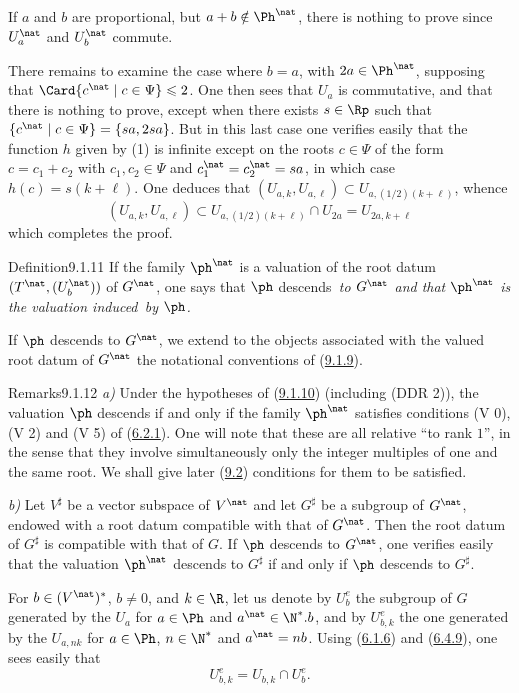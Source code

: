 \documentclass[12pt,a4paper,oneside,english]{smfart}
\makeatletter
\newcommand{\btanchor}[1]{\leavevmode\Hy@raisedlink{\hypertarget{bt:#1}{}}}
\newcommand{\btpageanchor}[1]{\Hy@raisedlink{\hypertarget{p:#1}{}}}
\newcommand{\btref}[1]{\hyperlink{bt:#1}{#1}}
\newcommand{\btpage}[1]{\marginnote{p.~#1}\btpageanchor{#1}}
\newcommand{\pg}[1]{\btpage{#1}}
\theoremstyle{definition}
\theoremstyle{bt}
\makeatother
\begin{document}
If $a$ and $b$ are proportional, but $a+b\notin\Ph^\nat$, there is nothing to prove
since $U^\nat_a$ and $U^\nat_b$ commute.

There remains to examine the case where $b=a$, with $2a\in\Ph^\nat$, supposing that
$\Card\{c^\nat\mid c\in\Psi\}\leqslant2$. One then sees that $U_a$ is commutative, and
that there is nothing to prove, except when there exists $s\in\Rp$ such that
$\{c^\nat\mid c\in\Psi\}=\{sa,2sa\}$. But in this last case one verifies easily that the
function $h$ given by (1) is infinite except on the roots $c\in\Psi$ of the form
$c=c_1+c_2$ with $c_1,c_2\in\Psi$ and $c_1^\nat=c_2^\nat=sa$, in which case
$h(c)=s(k+\ell)$. One deduces that
$(U_{a,k},U_{a,\ell})\subset U_{a,(1/2)(k+\ell)}$, whence
\[
(U_{a,k},U_{a,\ell})\subset U_{a,(1/2)(k+\ell)}\cap U_{2a}=U_{2a,k+\ell}
\]
which completes the proof.

\begin{stmt}{Definition}{9.1.11}\btanchor{9.1.11}
If the family $\ph^\nat$ is a valuation of the root datum
$(T^\nat,(U^\nat_b))$ of $G^\nat$, one says that $\ph$ \upshape descends\itshape\ to
$G^\nat$ and that $\ph^\nat$ is the valuation \upshape induced\itshape\ by $\ph$.
\end{stmt}

If $\ph$ descends to $G^\nat$, we extend to the objects associated with the valued
root datum of $G^\nat$ the notational conventions of (\btref{9.1.9}).

\begin{stmtup}{Remarks}{9.1.12}\btanchor{9.1.12}
\textit{a)} Under the hypotheses of (\btref{9.1.10}) (including (DDR 2)), the valuation $\ph$
descends if and only if the family $\ph^\nat$ satisfies conditions (V 0), (V 2) and
(V 5) of (\btref{6.2.1}). One will note that these are all relative ``to rank $1$'', in the
sense that they involve simultaneously only the integer multiples of one and the
\pg{200}
same root. We shall give later (\btref{9.2}) conditions for them to be satisfied.

\textit{b)} Let $V^\sharp$ be a vector subspace of $V^\nat$ and let $G^\sharp$ be a
subgroup of $G^\nat$, endowed with a root datum compatible with that of $G^\nat$. Then
the root datum of $G^\sharp$ is compatible with that of $G$. If $\ph$ descends to
$G^\nat$, one verifies easily that the valuation $\ph^\nat$ descends to $G^\sharp$ if
and only if $\ph$ descends to $G^\sharp$.
\end{stmtup}

\btanchor{9.1.13}
For $b\in(V^\nat)^*$, $b\neq0$, and $k\in\R$, let us denote by $U^e_b$ the subgroup of
$G$ generated by the $U_a$ for $a\in\Ph$ and $a^\nat\in\N^*.b$, and by $U^e_{b,k}$ the
one generated by the $U_{a,nk}$ for $a\in\Ph$, $n\in\N^*$ and $a^\nat=nb$. Using
(\btref{6.1.6}) and (\btref{6.4.9}), one sees easily that
\[
U^e_{b,k}=U_{b,k}\cap U^e_b .
\]
\end{document}
